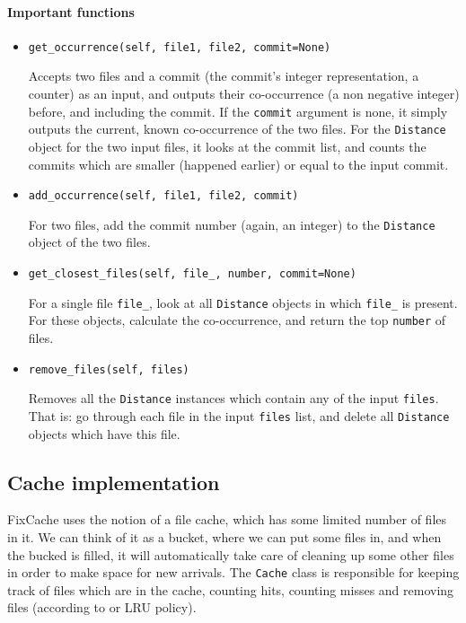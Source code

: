 \documentclass[12pt,twoside,notitlepage]{report}
\newcommand{\fxch}{FixCache }
\begin{document}
\paragraph{Important functions}
\begin{itemize}
\item \texttt{get\_occurrence(self, file1, file2, commit=None)}

Accepts two files and a commit (the commit's integer representation, a counter) as an input, and outputs their co-occurrence (a non negative integer) before, and including the commit. If the \texttt{commit} argument is none, it simply outputs the current, known co-occurrence of the two files. For the \texttt{Distance} object for the two input files, it looks at the commit list, and counts the commits which are smaller (happened earlier) or equal to the input commit.
\item \texttt{add\_occurrence(self, file1, file2, commit)}

For two files, add the commit number (again, an integer) to the \texttt{Distance} object of the two files.
\item \texttt{get\_closest\_files(self, file\_, number, commit=None)}

For a single file \texttt{file\_}, look at all \texttt{Distance} objects in which \texttt{file\_} is present. For these objects, calculate the co-occurrence, and return the top \texttt{number} of files.
\item \texttt{remove\_files(self, files)}

Removes all the \texttt{Distance} instances which contain any of the input \texttt{files}. That is: go through each file in the input \texttt{files} list, and delete all \texttt{Distance} objects which have this file.
\end{itemize}
\subsection{Cache implementation}
\fxch uses the notion of a file cache, which has some limited number of files in it. We can think of it as a bucket, where we can put some files in, and when the bucked is filled, it will automatically take care of cleaning up some other files in order to make space for new arrivals. The \texttt{Cache} class is responsible for keeping track of files which are in the cache, counting hits, counting misses and removing files (according to or LRU policy).	
\end{document}
